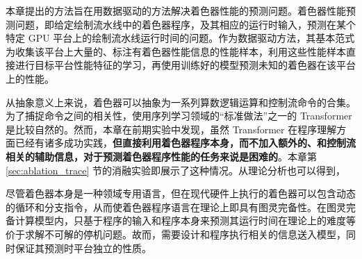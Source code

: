 \label{sec:design_decisions}

{\amend 本章提出的方法旨在用数据驱动的方法解决着色器性能的预测问题。着色器性能预测问题，即给定绘制流水线中的着色器程序，及其相应的运行时输入，预测在某个特定 GPU 平台上的绘制流水线运行时间的问题。作为数据驱动方法，其基本范式为收集该平台上大量的、标注有着色器性能信息的性能样本，利用这些性能样本直接进行目标平台性能特征的学习，再使用训练好的模型预测未知的着色器在该平台上的性能。

从抽象意义上来说，着色器可以抽象为一系列算数逻辑运算和控制流命令的合集。为了捕捉命令之间的相关性，使用序列学习领域的“标准做法”之一的 Transformer 是比较自然的。然而，本章在前期实验中发现，虽然 Transformer 在程序理解方面已经有诸多成功实践，{\bf 但直接利用着色器程序本身，而不加入额外的、和控制流相关的辅助信息，对于预测着色器程序性能的任务来说是困难的}。本章第 \ref{sec:ablation_trace} 节的消融实验即展示了这种情况。从理论分析也可以得到，}尽管着色器本身是一种领域专用语言，但在现代硬件上执行的着色器可以包含动态的循环和分支指令，从而使着色器程序语言在理论上即具有图灵完备性。在图灵完备计算模型内，只基于程序的输入和程序本身来预测其运行时间在理论上的难度等价于求解不可解的停机问题\cite{10.1112/plms/s2-42.1.230}。{\amend 故而，需要设计和程序执行相关的信息送入模型，同时保证其预测时平台独立的性质。}

